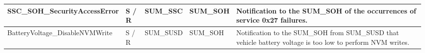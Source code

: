 \begin{longtable}{|l|l|l|l|l|}
\begin{minipage}{0.39\linewidth}\raggedright\vspace{.75ex}SSC\_SOH\_SecurityAccessError\vspace{.75ex}\end{minipage} & \begin{minipage}{0.07\linewidth}\raggedright\vspace{.75ex}S / R\vspace{.75ex}\end{minipage} & \begin{minipage}{0.11\linewidth}\raggedright\vspace{.75ex}SUM\_SSC\vspace{.75ex}\end{minipage} & \begin{minipage}{0.11\linewidth}\raggedright\vspace{.75ex}SUM\_SOH\vspace{.75ex}\end{minipage} & \begin{minipage}{0.16\linewidth}\raggedright\vspace{.75ex}Notification to the SUM\_SOH of the occurrences of service 0x27 failures.\vspace{.75ex}\end{minipage}\\\hline
\begin{minipage}{0.39\linewidth}\raggedright\vspace{.75ex}BatteryVoltage\_DisableNVMWrite\vspace{.75ex}\end{minipage} & \begin{minipage}{0.07\linewidth}\raggedright\vspace{.75ex}S / R\vspace{.75ex}\end{minipage} & \begin{minipage}{0.11\linewidth}\raggedright\vspace{.75ex}SUM\_SUSD\vspace{.75ex}\end{minipage} & \begin{minipage}{0.11\linewidth}\raggedright\vspace{.75ex}SUM\_SOH\vspace{.75ex}\end{minipage} & \begin{minipage}{0.16\linewidth}\raggedright\vspace{.75ex}Notification to the SUM\_SOH from SUM\_SUSD that vehicle battery voltage is too low to perform NVM writes.\vspace{.75ex}\end{minipage}\\\hline

\end{longtable}
